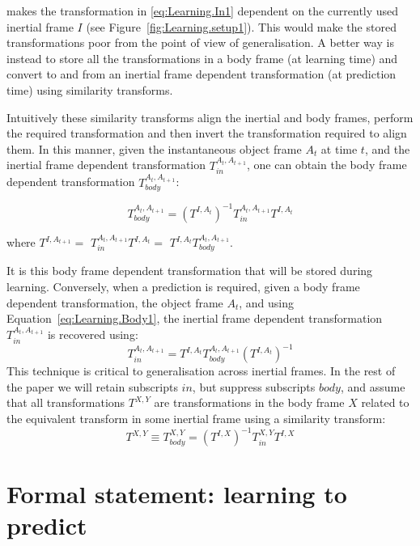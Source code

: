 \noindent makes the transformation in \eqref{eq:Learning.In1} dependent on the currently used inertial frame $I$ (see
Figure~\ref{fig:Learning.setup1}).  This would make the stored transformations poor from the point of view of generalisation. A better way is instead to store all the transformations in a body frame (at learning time) and convert to and from an inertial frame dependent transformation (at prediction time) using similarity transforms.

Intuitively these similarity transforms align the inertial and body frames, perform the
required transformation and then invert the transformation required to
align them. In this manner, given the instantaneous object frame
$A_{t}$ at time $t$, and the inertial frame dependent transformation
$T_{in}^{A_{t}, A_{t+1}}$, one can obtain the body frame dependent
transformation $T_{body}^{A_{t}, A_{t+1}}$:

\begin{equation}
T_{body}^{A_{t}, A_{t+1}} = (T^{I, A_{t}})^{-1} T_{in}^{A_{t}, A_{t+1}} T^{I, A_{t}}
\label{eq:Learning.Body1}
\end{equation}

\noindent where $T^{I, A_{t+1}} =$ $T_{in}^{A_{t}, A_{t+1}} T^{I, A_{t}} =$ $T^{I, A_{t}} T_{body}^{A_{t}, A_{t+1}}$.

It is this body frame dependent transformation that will be stored during learning. Conversely, when a prediction is required, given a body frame dependent transformation, the object
frame $A_{t}$, and using Equation~\eqref{eq:Learning.Body1}, the
inertial frame dependent transformation $T_{in}^{A_{t}, A_{t+1}}$ is
recovered using:
\begin{equation}
T_{in}^{A_{t}, A_{t+1}} = T^{I, A_{t}} T_{body}^{A_{t}, A_{t+1}} (T^{I, A_{t}})^{-1}
\label{eq:Learning.Body2}
\end{equation}
This technique is critical to generalisation across inertial frames. In the rest of the paper we will retain subscripts $in$, but suppress subscripts $body$, and assume that all transformations $T^{X, Y}$ are transformations in the body frame $X$ related to the equivalent transform in some inertial frame using a similarity transform:
\begin{equation}
T^{X, Y} \equiv T_{body}^{X, Y} = ({T^{I, X}})^{-1} T_{in}^{X, Y} {T^{I, X}}
\label{eq:Learning.Similarity}
\end{equation}

\section{Formal statement: learning to predict}
\label{sec:PredictionProblem}

